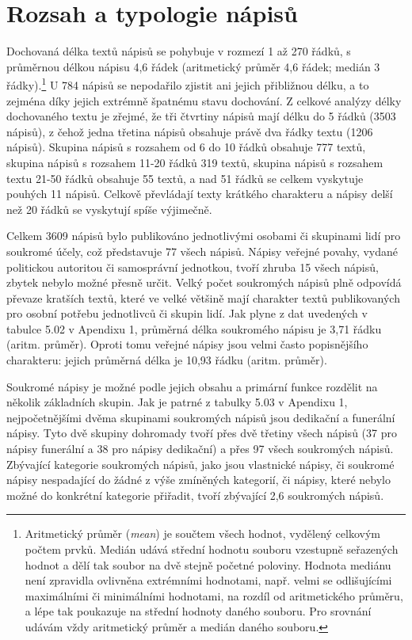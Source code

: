 \section[rozsah-a-typologie-nápisů]{Rozsah a typologie nápisů}

Dochovaná délka textů nápisů se pohybuje v rozmezí 1 až 270 řádků, s průměrnou délkou nápisu 4,6 řádek (aritmetický průměr 4,6 řádek; medián 3 řádky).\footnote{Aritmetický průměr ({\em mean}) je součtem všech hodnot, vydělený celkovým počtem prvků. Medián udává střední hodnotu souboru vzestupně seřazených hodnot a dělí tak soubor na dvě stejně početné poloviny. Hodnota mediánu není zpravidla ovlivněna extrémními hodnotami, např. velmi se odlišujícími maximálními či minimálními hodnotami, na rozdíl od aritmetického průměru, a lépe tak poukazuje na střední hodnoty daného souboru. Pro srovnání udávám vždy aritmetický průměr a medián daného souboru.} U 784 nápisů se nepodařilo zjistit ani jejich přibližnou délku, a to zejména díky jejich extrémně špatnému stavu dochování. Z celkové analýzy délky dochovaného textu je zřejmé, že tři čtvrtiny nápisů mají délku do 5 řádků (3503 nápisů), z čehož jedna třetina nápisů obsahuje právě dva řádky textu (1206 nápisů). Skupina nápisů s rozsahem od 6 do 10 řádků obsahuje 777 textů, skupina nápisů s rozsahem 11-20 řádků 319 textů, skupina nápisů s rozsahem textu 21-50 řádků obsahuje 55 textů, a nad 51 řádků se celkem vyskytuje pouhých 11 nápisů. Celkově převládají texty krátkého charakteru a nápisy delší než 20 řádků se vyskytují spíše výjimečně.

Celkem 3609 nápisů bylo publikováno jednotlivými osobami či skupinami lidí pro soukromé účely, což představuje 77  všech nápisů. Nápisy veřejné povahy, vydané politickou autoritou či samosprávní jednotkou, tvoří zhruba 15  všech nápisů, zbytek nebylo možné přesně určit. Velký počet soukromých nápisů plně odpovídá převaze kratších textů, které ve velké většině mají charakter textů publikovaných pro osobní potřebu jednotlivců či skupin lidí. Jak plyne z dat uvedených v tabulce 5.02 v Apendixu 1, průměrná délka soukromého nápisu je 3,71 řádku (aritm. průměr). Oproti tomu veřejné nápisy jsou velmi často popisnějšího charakteru: jejich průměrná délka je 10,93 řádku (aritm. průměr).

Soukromé nápisy je možné podle jejich obsahu a primární funkce rozdělit na několik základních skupin. Jak je patrné z tabulky 5.03 v Apendixu 1, nejpočetnějšími dvěma skupinami soukromých nápisů jsou dedikační a funerální nápisy. Tyto dvě skupiny dohromady tvoří přes dvě třetiny všech nápisů (37  pro nápisy funerální a 38  pro nápisy dedikační) a přes 97  všech soukromých nápisů. Zbývající kategorie soukromých nápisů, jako jsou vlastnické nápisy, či soukromé nápisy nespadající do žádné z výše zmíněných kategorií, či nápisy, které nebylo možné do konkrétní kategorie přiřadit, tvoří zbývající 2,6  soukromých nápisů.

